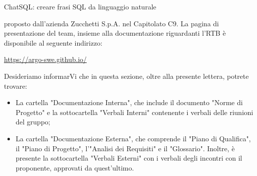 \quad ChatSQL: creare frasi SQL da linguaggio naturale \newline

proposto dall’azienda Zucchetti S.p.A. nel Capitolato C9. \newline
La pagina di presentazione del team, insieme alla documentazione riguardanti l'RTB è disponibile al seguente indirizzo: \newline

\quad \href{https://argo-swe.github.io/}{https://argo-swe.github.io/} \newline

Desideriamo informarVi che in questa sezione, oltre alla presente lettera, potrete trovare:
\begin{itemize}

  \item La cartella "Documentazione Interna", che include il documento "Norme di Progetto" e la sottocartella "Verbali Interni" contenente i verbali delle riunioni del gruppo;
  \item La cartella "Documentazione Esterna", che comprende il "Piano di Qualifica", il "Piano di Progetto", l'"Analisi dei Requisiti" e il "Glossario". Inoltre, è presente la sottocartella "Verbali Esterni" con i verbali degli incontri con il proponente, approvati da quest'ultimo.\newline
\end{itemize}

